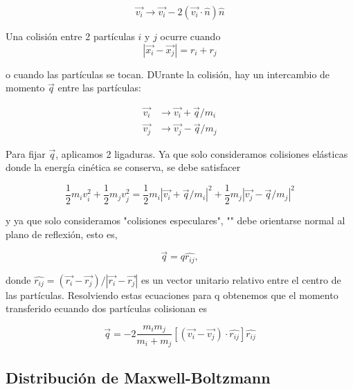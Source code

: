 \documentclass[11pt]{article}
\begin{document}
\begin{equation}
    \vec{v_{i}} \rightarrow\vec{v_{i}} - 2(\vec{v_{i}}\cdot\hat{n})\hat{n}
\end{equation}

Una colisión entre 2 partículas $i$ y $j$ ocurre cuando 
\begin{equation}
    |\vec{x_{i}} - \vec{x_{j}}| = r_{i} + r_{j}

\end{equation}

o cuando las partículas se tocan. DUrante la colisión, hay un intercambio de momento $\vec{q}$ entre las partículas:

\begin{equation} 
\begin{split}
\vec{v_{i}} & \rightarrow \vec{v_{i}} + \vec{q}/m_{i}  \\
 \vec{v_{j}} & \rightarrow \vec{v_{j}} - \vec{q}/m_{j}
\end{split}
\end{equation}

Para fijar $\vec{q}$, aplicamos 2 ligaduras. Ya que solo consideramos colisiones elásticas donde la energía cinética se conserva, se debe satisfacer 

\begin{equation}
    \dfrac{1}{2}m_{i}v_{i}^{2}+\dfrac{1}{2}m_{j}v_{j}^{2} = \dfrac{1}{2}m_{i}|\vec{v_{i}} + \vec{q}/m_{i}|^{2} + \dfrac{1}{2}m_{j}|\vec{v_{j}} - \vec{q}/m_{j}|^{2} 
\end{equation}

y ya que solo consideramos "colisiones especulares", "" debe orientarse normal al plano de reflexión, esto es,

\begin{equation}
    \vec{q} = q\hat{r_{ij}},
    
\end{equation}

donde $\hat{r_{ij}} = (\vec{r_{i}} - \vec{r_{j}})/|\vec{r_{i}} - \vec{r_{j}}|$ es un vector unitario relativo entre el centro de las partículas. Resolviendo estas ecuaciones para q obtenemos que el momento transferido ecuando dos partículas colisionan es

\begin{equation}
    \vec{q} = -2\dfrac{m_{i}m_{j}}{m_{i} + m_{j}}[(\vec{v_{i}} - \vec{v_{j}})\cdot\hat{r_{ij}}]\hat{r_{ij}}
\end{equation}

\subsection{Distribución de Maxwell-Boltzmann}
\end{document}
